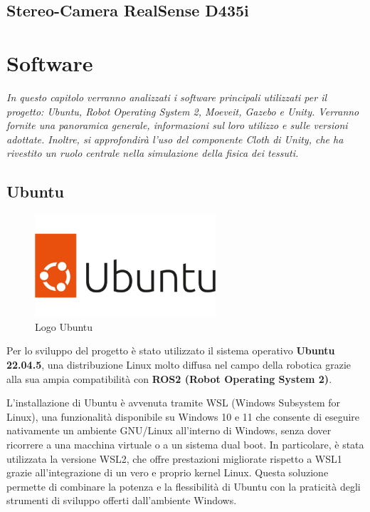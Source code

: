\documentclass[11pt]{report}
\begin{document}
\subsection{Stereo-Camera RealSense D435i}

\section{Software}
\textit{In questo capitolo verranno analizzati i software principali utilizzati per il progetto: Ubuntu, Robot Operating System 2, Moeveit, Gazebo e Unity. Verranno fornite una panoramica generale, informazioni sul loro utilizzo e sulle versioni adottate. Inoltre, si approfondirà l'uso del componente Cloth di Unity, che ha rivestito un ruolo centrale nella simulazione della fisica dei tessuti.}

\subsection{Ubuntu}

\begin{figure}[H]
    \centering
    \includegraphics[width=0.6\textwidth]{images/ubuntu1.png}
    \caption{Logo Ubuntu}
    \label{fig:Ubuntu}
\end{figure}

Per lo sviluppo del progetto è stato utilizzato il sistema operativo \textbf{Ubuntu 22.04.5}, una distribuzione Linux molto diffusa nel campo della robotica grazie alla sua ampia compatibilità con \textbf{ROS2 (Robot Operating System 2)}.

L’installazione di Ubuntu è avvenuta tramite WSL (Windows Subsystem for Linux), una funzionalità disponibile su Windows 10 e 11 che consente di eseguire nativamente un ambiente GNU/Linux all’interno di Windows, senza dover ricorrere a una macchina virtuale o a un sistema dual boot.
In particolare, è stata utilizzata la versione WSL2, che offre prestazioni migliorate rispetto a WSL1 grazie all’integrazione di un vero e proprio kernel Linux. Questa soluzione permette di combinare la potenza e la flessibilità di Ubuntu con la praticità degli strumenti di sviluppo offerti dall’ambiente Windows.
\end{document}
